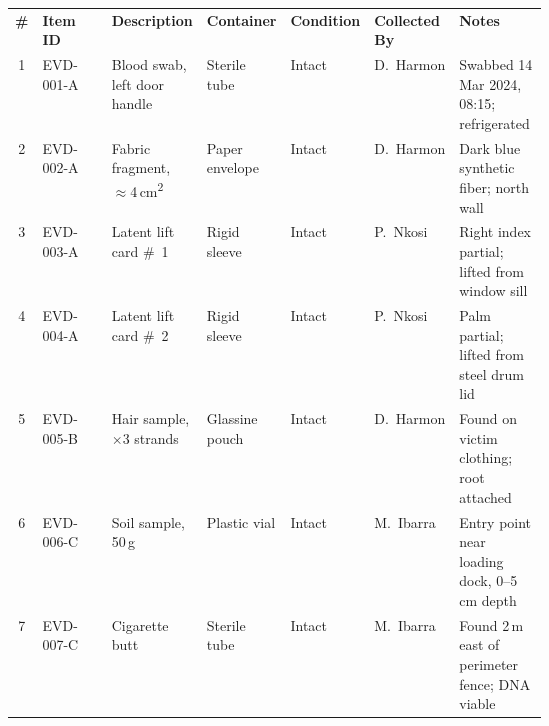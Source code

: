 \documentclass[letterpaper,11pt]{article}
\begin{document}
\begin{tcolorbox}[sectionbox, title={\faSearch\quad SPECIMEN INVENTORY}]
\small\sffamily
\setlength{\tabcolsep}{4pt}
\renewcommand{\arraystretch}{1.30}
\begin{tabularx}{\linewidth}{@{}c p{0.13\linewidth} p{0.17\linewidth} p{0.11\linewidth} p{0.10\linewidth} p{0.11\linewidth} X@{}}
  \rowcolor{ForensicBlue}
  \color{white}\bfseries\# &
  \color{white}\bfseries Item ID &
  \color{white}\bfseries Description &
  \color{white}\bfseries Container &
  \color{white}\bfseries Condition &
  \color{white}\bfseries Collected By &
  \color{white}\bfseries Notes \\
  \rowcolor{RowAlt}
  1 & EVD-001-A & Blood swab, left door handle & Sterile tube & Intact & D.\ Harmon &
    Swabbed 14 Mar 2024, 08:15; refrigerated \\
  2 & EVD-002-A & Fabric fragment, \(\approx\)4\,cm\textsuperscript{2} & Paper envelope &
    Intact & D.\ Harmon & Dark blue synthetic fiber; north wall \\
  \rowcolor{RowAlt}
  3 & EVD-003-A & Latent lift card \#~1 & Rigid sleeve & Intact & P.\ Nkosi &
    Right index partial; lifted from window sill \\
  4 & EVD-004-A & Latent lift card \#~2 & Rigid sleeve & Intact & P.\ Nkosi &
    Palm partial; lifted from steel drum lid \\
  \rowcolor{RowAlt}
  5 & EVD-005-B & Hair sample, \(\times\)3 strands & Glassine pouch & Intact & D.\ Harmon &
    Found on victim clothing; root attached \\
  6 & EVD-006-C & Soil sample, 50\,g & Plastic vial & Intact & M.\ Ibarra &
    Entry point near loading dock, 0--5\,cm depth \\
  \rowcolor{RowAlt}
  7 & EVD-007-C & Cigarette butt & Sterile tube & Intact & M.\ Ibarra &
    Found 2\,m east of perimeter fence; DNA viable \\
\end{tabularx}
\end{tcolorbox}

\vspace{5pt}
\end{document}
